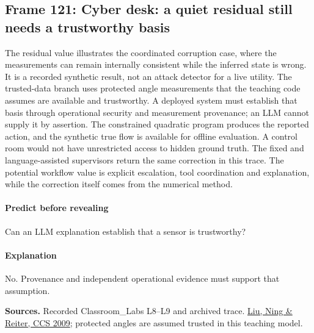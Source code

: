 \documentclass[11pt]{article}
\begin{document}
\subsection*{Frame 121: Cyber desk: a quiet residual still needs a trustworthy basis}
The residual value illustrates the coordinated corruption case, where the measurements can remain internally consistent while the inferred state is wrong. It is a recorded synthetic result, not an attack detector for a live utility. The trusted-data branch uses protected angle measurements that the teaching code assumes are available and trustworthy. A deployed system must establish that basis through operational security and measurement provenance; an LLM cannot supply it by assertion. The constrained quadratic program produces the reported action, and the synthetic true flow is available for offline evaluation. A control room would not have unrestricted access to hidden ground truth. The fixed and language-assisted supervisors return the same correction in this trace. The potential workflow value is explicit escalation, tool coordination and explanation, while the correction itself comes from the numerical method.\par
\paragraph{Predict before revealing}Can an LLM explanation establish that a sensor is trustworthy?
\paragraph{Explanation}No. Provenance and independent operational evidence must support that assumption.
\par\nopagebreak\begin{minipage}{\linewidth}{\footnotesize\color{slate}\textbf{Sources.} Recorded Classroom\_Labs L8--L9 and archived trace. \href{https://doi.org/10.1145/1653662.1653666}{Liu, Ning \& Reiter, CCS 2009}; protected angles are assumed trusted in this teaching model.\par}\end{minipage}\par\medskip
\end{document}
